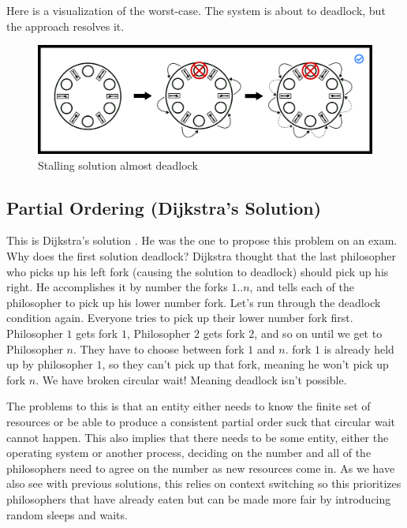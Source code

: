 Here is a visualization of the worst-case.
The system is about to deadlock, but the approach resolves it.

\begin{figure}[H]
\centering
\includegraphics[width=.9\textwidth]{deadlock/drawings/dining_stalling.png}
\caption{Stalling solution almost deadlock}
\end{figure}


\subsection{Partial Ordering (Dijkstra's Solution)}

This is Dijkstra's solution \cite[P. 20]{EWD:EWD310}. He was the one to propose this problem on an exam.
Why does the first solution deadlock? Dijkstra thought that the last philosopher who picks up his left fork (causing the solution to deadlock) should pick up his right.
He accomplishes it by number the forks $1..n$, and tells each of the philosopher to pick up his lower number fork.
Let's run through the deadlock condition again.
Everyone tries to pick up their lower number fork first.
Philosopher $1$ gets fork $1$, Philosopher $2$ gets fork $2$, and so on until we get to Philosopher $n$.
They have to choose between fork $1$ and $n$.
fork $1$ is already held up by philosopher $1$, so they can't pick up that fork, meaning he won't pick up fork $n$.
We have broken circular wait! Meaning deadlock isn't possible.

The problems to this is that an entity either needs to know the finite set of resources or be able to produce a consistent partial order suck that circular wait cannot happen.
This also implies that there needs to be some entity, either the operating system or another process, deciding on the number and all of the philosophers need to agree on the number as new resources come in.
As we have also see with previous solutions, this relies on context switching so this prioritizes philosophers that have already eaten but can be made more fair by introducing random sleeps and waits.

